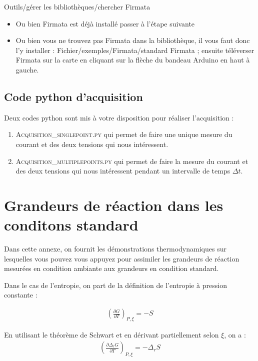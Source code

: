 \documentclass[twoside,a4paper,11pt,answers,addpoints]{exam}
\begin{document}
Outils/gérer les bibliothèques/chercher Firmata
\begin{itemize}
\item Ou bien Firmata est déjà installé passer à l'étape suivante
\item Ou bien vous ne trouvez pas Firmata dans la bibliothèque, il vous faut donc l'y installer :
Fichier/exemples/Firmata/standard Firmata ; ensuite téléverser Firmata sur la carte en cliquant sur la flèche du bandeau Arduino en haut à gauche.
\end{itemize}

\subsection{Code python d'acquisition}

Deux codes python sont mis à votre disposition pour réaliser l'acquisition : 
\begin{enumerate}
\item \textsc{Acquisition\_singlepoint.py} qui permet de faire une unique mesure du courant et des deux tensions qui nous intéressent.

\item \textsc{Acquisition\_multiplepoints.py} qui permet de faire la mesure du courant et des deux tensions qui nous intéressent pendant un intervalle de temps $\Delta t$.

\end{enumerate}

	




\section{Grandeurs de réaction dans les conditons standard}
\label{sec:DrH&DrS}

Dans cette annexe, on fournit les démonstrations thermodynamiques sur lesquelles vous pouvez vous appuyez pour assimiler les grandeurs de réaction mesurées en condition ambiante aux grandeurs en condition standard.

Dans le cas de l'entropie, on part de la définition de l'entropie à pression constante : 

\begin{align}
\left( \frac{\partial G}{\partial T} \right)_{P, \xi} = - S \label{eq:def_S}
\end{align}

En utilisant le théorème de Schwart et en dérivant partiellement selon $\xi$, on a : 
\begin{align}
\left( \frac{\partial \Delta_r G}{\partial T} \right)_{P, \xi} = - \Delta_r S
\end{align}
\end{document}
